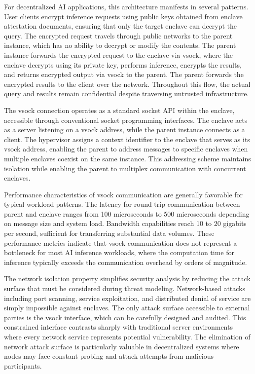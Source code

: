 For decentralized AI applications, this architecture manifests in several patterns. User clients encrypt inference requests using public keys obtained from enclave attestation documents, ensuring that only the target enclave can decrypt the query. The encrypted request travels through public networks to the parent instance, which has no ability to decrypt or modify the contents. The parent instance forwards the encrypted request to the enclave via vsock, where the enclave decrypts using its private key, performs inference, encrypts the results, and returns encrypted output via vsock to the parent. The parent forwards the encrypted results to the client over the network. Throughout this flow, the actual query and results remain confidential despite traversing untrusted infrastructure.

The vsock connection operates as a standard socket API within the enclave, accessible through conventional socket programming interfaces. The enclave acts as a server listening on a vsock address, while the parent instance connects as a client. The hypervisor assigns a context identifier to the enclave that serves as its vsock address, enabling the parent to address messages to specific enclaves when multiple enclaves coexist on the same instance. This addressing scheme maintains isolation while enabling the parent to multiplex communication with concurrent enclaves.

Performance characteristics of vsock communication are generally favorable for typical workload patterns. The latency for round-trip communication between parent and enclave ranges from 100 microseconds to 500 microseconds depending on message size and system load. Bandwidth capabilities reach 10 to 20 gigabits per second, sufficient for transferring substantial data volumes. These performance metrics indicate that vsock communication does not represent a bottleneck for most AI inference workloads, where the computation time for inference typically exceeds the communication overhead by orders of magnitude.

The network isolation property simplifies security analysis by reducing the attack surface that must be considered during threat modeling. Network-based attacks including port scanning, service exploitation, and distributed denial of service are simply impossible against enclaves. The only attack surface accessible to external parties is the vsock interface, which can be carefully designed and audited. This constrained interface contrasts sharply with traditional server environments where every network service represents potential vulnerability. The elimination of network attack surface is particularly valuable in decentralized systems where nodes may face constant probing and attack attempts from malicious participants.

